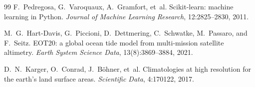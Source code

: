 \documentclass[twocolumn,9pt]{extarticle}
\begin{document}
\begin{thebibliography}{99}
F.~Pedregosa, G.~Varoquaux, A.~Gramfort, et~al.
\newblock Scikit-learn: machine learning in Python.
\newblock \emph{Journal of Machine Learning Research}, 12:2825--2830, 2011.

M.~G.~Hart-Davis, G.~Piccioni, D.~Dettmering, C.~Schwatke, M.~Passaro, and F.~Seitz.
\newblock EOT20: a global ocean tide model from multi-mission satellite altimetry.
\newblock \emph{Earth System Science Data}, 13(8):3869--3884, 2021.

D.~N.~Karger, O.~Conrad, J.~B\"ohner, et~al.
\newblock Climatologies at high resolution for the earth's land surface areas.
\newblock \emph{Scientific Data}, 4:170122, 2017.

\end{thebibliography}
\end{document}
